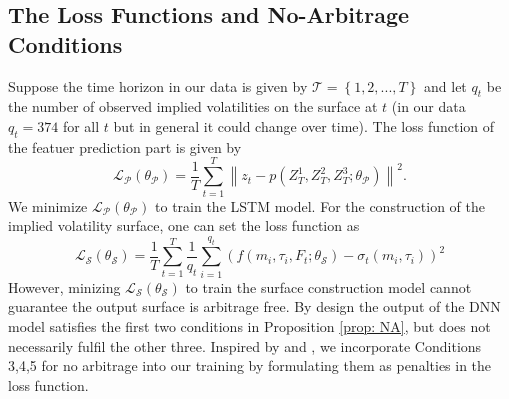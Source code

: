 \documentclass[11pt,a4paper]{article}
\theoremstyle{remark}
\begin{document}
\subsection{The Loss Functions and No-Arbitrage Conditions}\label{sec:loss}
Suppose the time horizon in our data is given by $\mathcal{T} = \left\{1,2,...,T\right\}$ and let $q_t$ be the number of observed implied volatilities on the surface at $t$ (in our data $q_t=374$ for all $t$ but in general it could change over time). The loss function of the featuer prediction part is given by
\begin{equation}
	\mathcal{L}_{\mathcal{P}}(\theta_{\mathcal{P}}) = \frac{1}{T} \sum_{t=1}^{T} \left\|z_{t}-p\left(Z^1_T,Z^2_T,Z^3_T; \theta_{\mathcal{P}}\right) \right\|^{2}.  \label{loss: seq}
\end{equation}
We minimize $\mathcal{L}_{\mathcal{P}}(\theta_{\mathcal{P}})$ to train the LSTM model. For the construction of the implied volatility surface, one can set the loss function as
\begin{equation}
\mathcal{L}_{\mathcal{S}}(\theta_{\mathcal{S}}) = \frac{1}{T} \sum_{t=1}^{T}\frac{1}{q_t}\sum_{i=1}^{q_t}
	(f\left(m_i, \tau_i, F_{t} ; \theta_{\mathcal{S}}\right) - \sigma_{t}\left(m_i, \tau_i \right))^{2}  \label{loss: smooth1}
\end{equation}
However, minizing $\mathcal{L}_{\mathcal{S}}(\theta_{\mathcal{S}})$ to train the surface construction model cannot guarantee the output surface is arbitrage free. By design the output of the DNN model satisfies the first two conditions in Proposition \ref{prop: NA}, but does not necessarily fulfil the other three.  Inspired by \cite{zheng2019gated} and \cite{deep_IVS}, we incorporate Conditions 3,4,5 for no arbitrage into our training by formulating them as penalties in the loss function. 
\end{document}
